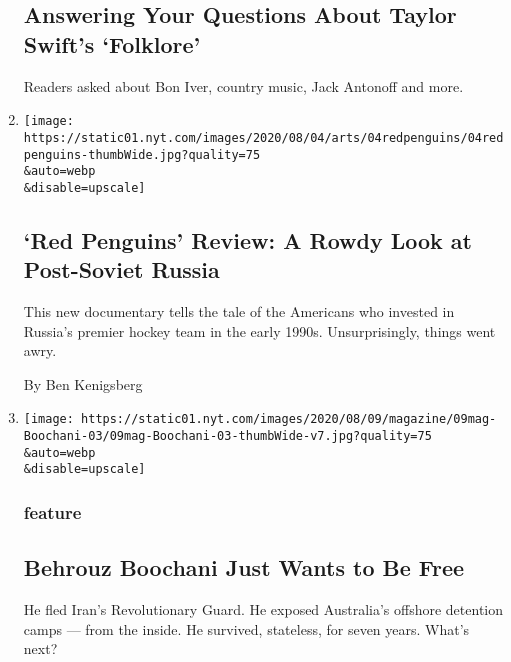\begin{enumerate}
  \hypertarget{answering-your-questions-about-taylor-swifts-folklore}{%
  \subsection{Answering Your Questions About Taylor Swift's
  `Folklore'}\label{answering-your-questions-about-taylor-swifts-folklore}}

  Readers asked about Bon Iver, country music, Jack Antonoff and more.
\item
  \href{/2020/08/04/movies/red-penguins-review.html}{}

  \texttt{[image: https://static01.nyt.com/images/2020/08/04/arts/04redpenguins/04redpenguins-thumbWide.jpg?quality=75\\\&auto=webp\\\&disable=upscale]}

  \hypertarget{red-penguins-review-a-rowdy-look-at-post-soviet-russia}{%
  \subsection{`Red Penguins' Review: A Rowdy Look at Post-Soviet
  Russia}\label{red-penguins-review-a-rowdy-look-at-post-soviet-russia}}

  This new documentary tells the tale of the Americans who invested in
  Russia's premier hockey team in the early 1990s. Unsurprisingly,
  things went awry.

  By Ben Kenigsberg
\item
  \href{/2020/08/04/magazine/behrouz-boochani-australia.html}{}

  \texttt{[image: https://static01.nyt.com/images/2020/08/09/magazine/09mag-Boochani-03/09mag-Boochani-03-thumbWide-v7.jpg?quality=75\\\&auto=webp\\\&disable=upscale]}

  \hypertarget{feature}{%
  \subsubsection{feature}\label{feature}}

  \hypertarget{behrouz-boochani-just-wants-to-be-free}{%
  \subsection{Behrouz Boochani Just Wants to Be
  Free}\label{behrouz-boochani-just-wants-to-be-free}}

  He fled Iran's Revolutionary Guard. He exposed Australia's offshore
  detention camps --- from the inside. He survived, stateless, for seven
  years. What's next?


\end{enumerate}
